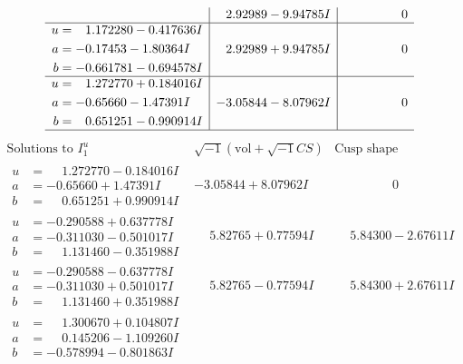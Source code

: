 \documentclass[1p]{elsarticle_modified}
\theoremstyle{definition}
\newcommand{\I}{\sqrt{-1}}
\begin{document}
$$\begin{array}{c|c|c}
 & \phantom{-}2.92989 - 9.94785 I & \phantom{-0.000000 } 0 \\ \hline\begin{aligned}
u &= \phantom{-}1.172280 - 0.417636 I \\
a &= -0.17453 - 1.80364 I \\
b &= -0.661781 - 0.694578 I\end{aligned}
 & \phantom{-}2.92989 + 9.94785 I & \phantom{-0.000000 } 0 \\ \hline\begin{aligned}
u &= \phantom{-}1.272770 + 0.184016 I \\
a &= -0.65660 - 1.47391 I \\
b &= \phantom{-}0.651251 - 0.990914 I\end{aligned}
 & -3.05844 - 8.07962 I & \phantom{-0.000000 } 0\\
 \hline 
 \end{array}$$\newpage$$\begin{array}{c|c|c}  
\text{Solutions to }I^u_{1}& \I (\text{vol} + \sqrt{-1}CS) & \text{Cusp shape}\\
 \hline 
\begin{aligned}
u &= \phantom{-}1.272770 - 0.184016 I \\
a &= -0.65660 + 1.47391 I \\
b &= \phantom{-}0.651251 + 0.990914 I\end{aligned}
 & -3.05844 + 8.07962 I & \phantom{-0.000000 } 0 \\ \hline\begin{aligned}
u &= -0.290588 + 0.637778 I \\
a &= -0.311030 - 0.501017 I \\
b &= \phantom{-}1.131460 - 0.351988 I\end{aligned}
 & \phantom{-}5.82765 + 0.77594 I & \phantom{-}5.84300 - 2.67611 I \\ \hline\begin{aligned}
u &= -0.290588 - 0.637778 I \\
a &= -0.311030 + 0.501017 I \\
b &= \phantom{-}1.131460 + 0.351988 I\end{aligned}
 & \phantom{-}5.82765 - 0.77594 I & \phantom{-}5.84300 + 2.67611 I \\ \hline\begin{aligned}
u &= \phantom{-}1.300670 + 0.104807 I \\
a &= \phantom{-}0.145206 - 1.109260 I \\
b &= -0.578994 - 0.801863 I\end{aligned}

\end{array}$$
\end{document}
